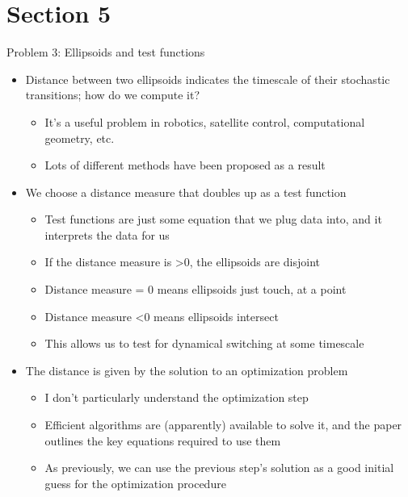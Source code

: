 \documentclass[presentation]{beamer}
\begin{document}
\section{Section 5}
\label{sec:orge09654f}
\begin{frame}[label={sec:orgc06a7d5},plain]{Problem 3: Ellipsoids and test functions}
\begin{itemize}
\item Distance between two ellipsoids indicates the timescale of their stochastic transitions; how do we compute it?
\begin{itemize}
\item It's a useful problem in robotics, satellite control, computational geometry, etc.
\item Lots of different methods have been proposed as a result
\end{itemize}
\end{itemize}
\vfill
\begin{itemize}
\item We choose a distance measure that doubles up as a test function
\begin{itemize}
\item Test functions are just some equation that we plug data into, and it interprets the data for us
\item If the distance measure is >0, the ellipsoids are disjoint
\item Distance measure = 0 means ellipsoids just touch, at a point
\item Distance measure <0 means ellipsoids intersect
\item This allows us to test for dynamical switching at some timescale
\end{itemize}
\end{itemize}
\vfill
\begin{itemize}
\item The distance is given by the solution to an optimization problem
\begin{itemize}
\item I don't particularly understand the optimization step
\item Efficient algorithms are (apparently) available to solve it, and the paper outlines the key equations required to use them
\item As previously, we can use the previous step's solution as a good initial guess for the optimization procedure
\end{itemize}
\end{itemize}
\end{frame}
\end{document}
